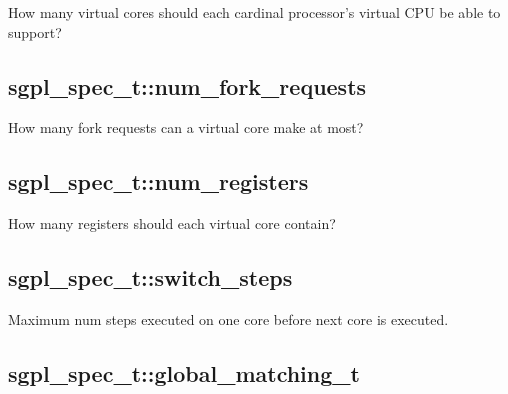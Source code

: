 How many virtual cores should each cardinal processor's virtual CPU be able to support?

\subsection{sgpl\_spec\_t::num\_fork\_requests}


How many fork requests can a virtual core make at most?

\subsection{sgpl\_spec\_t::num\_registers}


How many registers should each virtual core contain?

\subsection{sgpl\_spec\_t::switch\_steps}


Maximum num steps executed on one core before next core is executed.

\subsection{sgpl\_spec\_t::global\_matching\_t}

